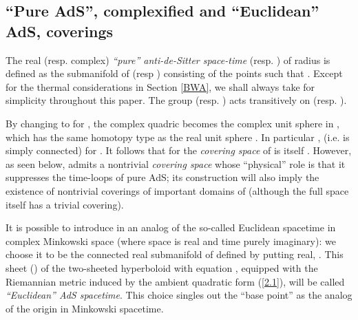 \documentclass[a4paper,a4paper]{article}
\def\bC{{\bf C}}
\def\bZ{{\bf Z}}
\def\wt{\widetilde}
\def\amb{E_{d+1}}
\begin{document}
\subsection{``Pure AdS'', complexified and ``Euclidean'' AdS,
coverings}
\label{pureetc}


\vskip 0.2cm
The real (resp. complex) {\sl ``pure'' anti-de-Sitter space-time} \coordHE{}
(resp. \coordHE{}) of radius \coordHE{} is defined as the submanifold of
\myHighlight{$\amb$}\coordHE{} (resp \myHighlight{$\amb^{(c)}$}\coordHE{}) consisting of the points \coordHE{}
such that \coordHE{}.
Except for the thermal considerations in Section
\ref{BWA}, we shall always take for simplicity \coordHE{} throughout
this paper.
The group \coordHE{} (resp. \coordHE{}) acts
transitively on \coordHE{} (resp. \coordHE{}).


By changing \coordHE{}
to \coordHE{} for \coordHE{},
the complex quadric \coordHE{} becomes
the complex unit sphere in \myHighlight{$\bC^{d+1}$}\coordHE{}, which has the
same homotopy type as the real unit sphere \coordHE{}.
In particular
\myHighlight{$\pi_1(X_1^{(c)}) = \bZ$}\coordHE{}, \coordHE{} (i.e.
\coordHE{} is simply connected) for \coordHE{}.
It follows that for \coordHE{} the {\sl covering space} of \coordHE{}
is \coordHE{} itself .
However, as seen below, \coordHE{} admits a nontrivial
{\sl covering space}
\myHighlight{$\wt X_d$}\coordHE{} whose ``physical'' role
is that it suppresses the time-loops
of pure AdS; its construction will also imply the existence of
nontrivial coverings of important domains of
\coordHE{} (although the full space
\coordHE{} itself has a trivial covering).

\vskip 0.2cm
It is possible to introduce in \coordHE{} an analog of
the so-called Euclidean spacetime in complex Minkowski
space (where space is real and time purely imaginary):
we choose it to be the connected real submanifold
\coordHE{}
of \coordHE{}
defined by putting
\coordHE{} real, \coordHE{}.
This sheet (\coordHE{}) of the two-sheeted hyperboloid
with equation \coordHE{},
equipped with the Riemannian metric induced by the
ambient quadratic form (\ref{2.1}), will be called
{\sl ``Euclidean'' AdS spacetime}. This choice
singles out the ``base point'' \coordHE{}
as the analog of the origin in Minkowski spacetime.
\end{document}
